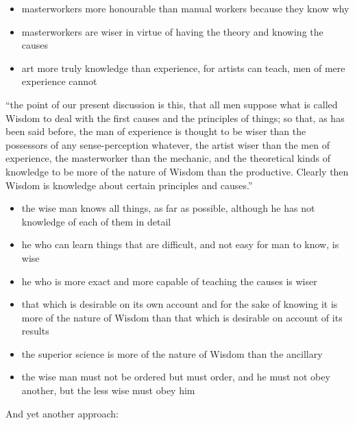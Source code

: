 \documentclass{rbjk}
\begin{document}
\begin{article}
\begin{itemize}
\item masterworkers more honourable than manual workers because they know why
\item masterworkers are wiser in virtue of having the theory and knowing the causes
\item art more truly knowledge than experience, for artists can teach, men of mere experience cannot
\end{itemize}

``the point of our present discussion is this, that all men suppose what is called Wisdom to deal with the first causes and the principles of things; so that, as has been said before, the man of experience is thought to be wiser than the possessors of any sense-perception whatever, the artist wiser than the men of experience, the masterworker than the mechanic, and the theoretical kinds of knowledge to be more of the nature of Wisdom than the productive. Clearly then Wisdom is knowledge about certain principles and causes.''

\begin{itemize}
\item the wise man knows all things, as far as possible, although he has not knowledge of each of them in detail
\item he who can learn things that are difficult, and not easy for man to know, is wise
\item he who is more exact and more capable of teaching the causes is wiser
\item that which is desirable on its own account and for the sake of knowing it is more of the nature of Wisdom than that which is desirable on account of its results
\item the superior science is more of the nature of Wisdom than the ancillary
\item the wise man must not be ordered but must order, and he must not obey another, but the less wise must obey him
\end{itemize}

And yet another approach:


\end{article}
\end{document}
